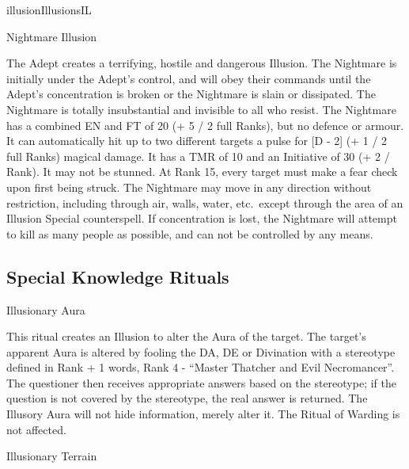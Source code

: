 \begin{college}[1.4]{illusion}{Illusions}{IL}
\begin{spell}[S-14]{Nightmare Illusion}
\begin{effects}
The Adept creates a terrifying, hostile and dangerous Illusion. The
Nightmare is initially under the Adept's control, and will obey their
commands until the Adept's concentration is broken or the Nightmare is
slain or dissipated. The Nightmare is totally insubstantial and
invisible to all who resist. The Nightmare has a combined EN and FT of
20 (+ 5 / 2 full Ranks), but no defence or armour.  It can
automatically hit up to two different targets a pulse for [D - 2] (+ 1
/ 2 full Ranks) magical damage. It has a TMR of 10 and an Initiative
of 30 (+ 2 / Rank). It may not be stunned. At Rank 15, every target
must make a fear check upon first being struck. The Nightmare may move
in any direction without restriction, including through air, walls,
water, etc.\ except through the area of an Illusion Special
counterspell.  If concentration is lost, the Nightmare will attempt to
kill as many people as possible, and can not be controlled by any
means.
\end{effects}
\end{spell}

\subsection{Special Knowledge Rituals}

\begin{ritual}[R-1]{Illusionary Aura}

\begin{effects}
This ritual creates an Illusion to alter the Aura of the target.  The
target's apparent Aura is altered by fooling the DA, DE or Divination
with a stereotype defined in Rank + 1 words, \eg Rank 4 - ``Master
Thatcher and Evil Necromancer''. The questioner then receives
appropriate answers based on the stereotype; if the question is not
covered by the stereotype, the real answer is returned. The Illusory
Aura will not hide information, merely alter it. The Ritual of Warding
is not affected.
\end{effects}
\end{ritual}

\begin{ritual}[R-2]{Illusionary Terrain}


\end{ritual}
\end{college}
